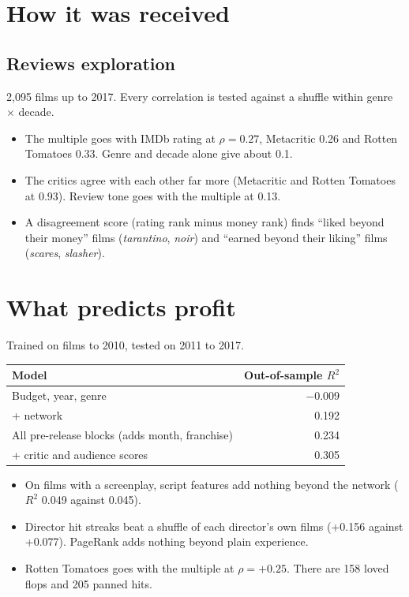 \documentclass[10pt]{article}
\begin{document}
\section{How it was received}

\subsection{Reviews exploration }
2,095 films up to 2017. Every correlation is tested against a shuffle within genre $\times$ decade.
\begin{itemize}
  \item The multiple goes with IMDb rating at $\rho = 0.27$, Metacritic 0.26 and Rotten Tomatoes 0.33. Genre and decade alone give about 0.1.
  \item The critics agree with each other far more (Metacritic and Rotten Tomatoes at 0.93). Review tone goes with the multiple at 0.13.
  \item A disagreement score (rating rank minus money rank) finds ``liked beyond their money'' films (\textit{tarantino}, \textit{noir}) and ``earned beyond their liking'' films (\textit{scares}, \textit{slasher}).
\end{itemize}

\section{What predicts profit }
Trained on films to 2010, tested on 2011 to 2017.

\begin{tabularx}{0.62\linewidth}{@{}Lr@{}}
\toprule
Model & Out-of-sample $R^2$ \\
\midrule
Budget, year, genre & $-0.009$ \\
+ network & 0.192 \\
All pre-release blocks (adds month, franchise) & 0.234 \\
+ critic and audience scores & 0.305 \\
\bottomrule
\end{tabularx}
\begin{itemize}
  \item On films with a screenplay, script features add nothing beyond the network ($R^2$ 0.049 against 0.045).
  \item Director hit streaks beat a shuffle of each director's own films (+0.156 against +0.077). PageRank adds nothing beyond plain experience.
  \item Rotten Tomatoes goes with the multiple at $\rho = +0.25$. There are 158 loved flops and 205 panned hits.
\end{itemize}
\end{document}
